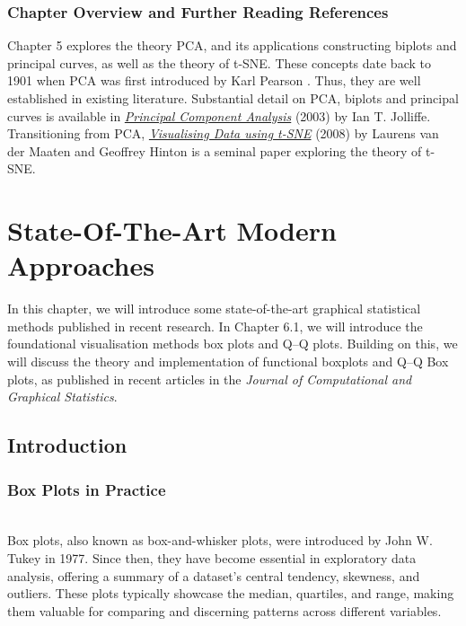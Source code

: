 \documentclass{article}\usepackage[]{graphicx}\usepackage[]{xcolor}
\numberwithin{equation}{section}
\begin{document}
\subsubsection*{Chapter Overview and Further Reading References}

\noindent Chapter 5 explores the theory PCA, and its applications constructing biplots and principal curves, as well as the theory of t-SNE. These concepts date back to 1901 when PCA was first introduced by Karl Pearson \cite{pearson1901liii}. Thus, they are well established in existing literature. Substantial detail on PCA, biplots and principal curves is available in \href{https://link.springer.com/book/10.1007/b98835}{\textit{Principal Component Analysis}} (2003) by Ian T. Jolliffe. Transitioning from PCA, \href{https://www.jmlr.org/papers/volume9/vandermaaten08a/vandermaaten08a.pdf}{\textit{Visualising Data using t-SNE}} (2008) by  Laurens van der Maaten and Geoffrey Hinton is a seminal paper exploring the theory of t-SNE. 

\newpage 

\section{State-Of-The-Art Modern Approaches}

In this chapter, we will introduce some state-of-the-art graphical statistical methods published in recent research. In Chapter 6.1, we will introduce the foundational visualisation methods box plots and Q–Q plots. Building on this, we will discuss the theory and implementation of functional boxplots and Q–Q Box plots, as published in recent articles in the \textit{Journal of Computational and Graphical Statistics}. 

\subsection{Introduction}

\subsubsection{Box Plots in Practice}\\

\noindent 
Box plots, also known as box-and-whisker plots, were introduced by John W. Tukey in 1977. Since then, they have become essential in exploratory data analysis, offering a summary of a dataset's central tendency, skewness, and outliers. These plots typically showcase the median, quartiles, and range, making them valuable for comparing and discerning patterns across different variables.\\
\end{document}
